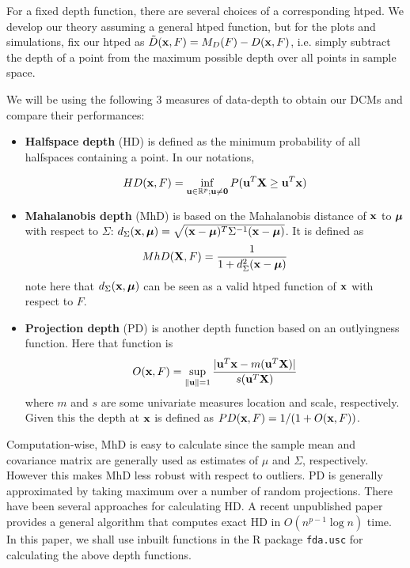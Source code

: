 \documentclass[fleqn,11pt]{article}
\begin{document}
For a fixed depth function, there are several choices of a corresponding htped. We develop our theory assuming a general htped function, but for the plots and simulations, fix our htped as $\tilde D({\bf{x}}, F) = M_D(F) - D({\bf{x}}, F)$, i.e. simply subtract the depth of a point from the maximum possible depth over all points in sample space.

We will be using the following 3 measures of data-depth to obtain our DCMs and compare their performances:

\begin{itemize}
\item \textbf{Halfspace depth} (HD) \citep{tukey75} is defined as the minimum probability of all halfspaces containing a point. In our notations,

$$ HD({\bf{x}}, F)  = \inf_{{\bf{u}} \in \mathbb{R}^p; {\bf{u}} \neq \bf0} P({\bf{u}}^T {\mathbf{X}} \geq {\bf{u}}^T {\bf{x}}) $$

\item \textbf{Mahalanobis depth} (MhD) \citep{LiuPareliusSingh99} is based on the Mahalanobis distance of ${\bf{x}}$ to ${\boldsymbol{\mu}}$ with respect to $\Sigma$: $d_\Sigma({\bf{x}}, {\boldsymbol{\mu}}) = \sqrt{({\bf{x}} - {\boldsymbol{\mu}})^T \Sigma^{-1} ({\bf{x}} - {\boldsymbol{\mu}})}$. It is defined as
%
$$ MhD({\mathbf{X}}, F) = \frac{1}{1 + d^2_\Sigma ({\bf{x}} - {\boldsymbol{\mu}})} $$
%
note here that $d_\Sigma({\bf{x}},{\boldsymbol{\mu}})$ can be seen as a valid htped function of ${\bf{x}}$ with respect to $F$.

\item \textbf{Projection depth} (PD) \citep{zuo03} is another depth function based on an outlyingness function. Here that function is
%
$$ O({\bf{x}}, F) = \sup_{\| {\bf{u}} \| = 1} \frac{| {\bf{u}}^T{\bf{x}} - m({\bf{u}}^T{\mathbf{X}})|}{s({\bf{u}}^T{\mathbf{X}})} $$
%
where $m$ and $s$ are some univariate measures location and scale, respectively. Given this the depth at ${\bf{x}}$ is defined as $PD({\bf{x}}, F) = 1/(1+O({\bf{x}}, F))$.
\end{itemize}

Computation-wise, MhD is easy to calculate since the sample mean and covariance matrix are generally used as estimates of $\mu$ and $\Sigma$, respectively. However this makes MhD less robust with respect to outliers. PD is generally approximated by taking maximum over a number of random projections. There have been several approaches for calculating HD. A recent unpublished paper \citep{rainerArxiv} provides a general algorithm that computes exact HD in $O(n^{p-1}\log n)$ time. In this paper, we shall use inbuilt functions in the R package \texttt{fda.usc} for calculating the above depth functions.
\end{document}

